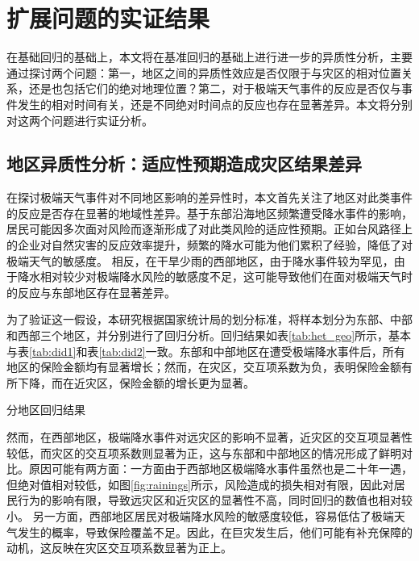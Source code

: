 \chapter{扩展问题的实证结果}\label{chap:4.1}
在基础回归的基础上，本文将在基准回归的基础上进行进一步的异质性分析，主要通过探讨两个问题：第一，地区之间的异质性效应是否仅限于与灾区的相对位置关系，还是也包括它们的绝对地理位置？第二，对于极端天气事件的反应是否仅与事件发生的相对时间有关，还是不同绝对时间点的反应也存在显著差异。本文将分别对这两个问题进行实证分析。

\section{地区异质性分析：适应性预期造成灾区结果差异}
在探讨极端天气事件对不同地区影响的差异性时，本文首先关注了地区对此类事件的反应是否存在显著的地域性差异。基于东部沿海地区频繁遭受降水事件的影响，居民可能因多次面对风险而逐渐形成了对此类风险的适应性预期。正如台风路径上的企业对自然灾害的反应效率提升\citep{0Do}，频繁的降水可能为他们累积了经验，降低了对极端天气的敏感度\citep{陈思柳2021不同决策情境下的损失厌恶效应差异}。
相反，在干旱少雨的西部地区，由于降水事件较为罕见，由于降水相对较少对极端降水风险的敏感度不足，这可能导致他们在面对极端天气时的反应与东部地区存在显著差异。

为了验证这一假设，本研究根据国家统计局的划分标准，将样本划分为东部、中部和西部三个地区，并分别进行了回归分析。回归结果如表\ref{tab:het_geo}所示，基本与表\ref{tab:did1}和表\ref{tab:did2}一致。东部和中部地区在遭受极端降水事件后，所有地区的保险金额均有显著增长；然而，在灾区，交互项系数为负，表明保险金额有所下降，而在近灾区，保险金额的增长更为显著。

\begin{table}
    \centering
    \caption{分地区回归结果}\label{tab:het_geo}
    
\end{table}

然而，在西部地区，极端降水事件对远灾区的影响不显著，近灾区的交互项显著性较低，而灾区的交互项系数则显著为正，这与东部和中部地区的情况形成了鲜明对比。原因可能有两方面：一方面由于西部地区极端降水事件虽然也是二十年一遇，但绝对值相对较低，如图\ref{fig:rainings}所示，风险造成的损失相对有限，因此对居民行为的影响有限，导致远灾区和近灾区的显著性不高，同时回归的数值也相对较小。
另一方面，西部地区居民对极端降水风险的敏感度较低，容易低估了极端天气发生的概率\citep{tversky1973availability}，导致保险覆盖不足。因此，在巨灾发生后，他们可能有补充保障的动机，这反映在灾区交互项系数显著为正上。

